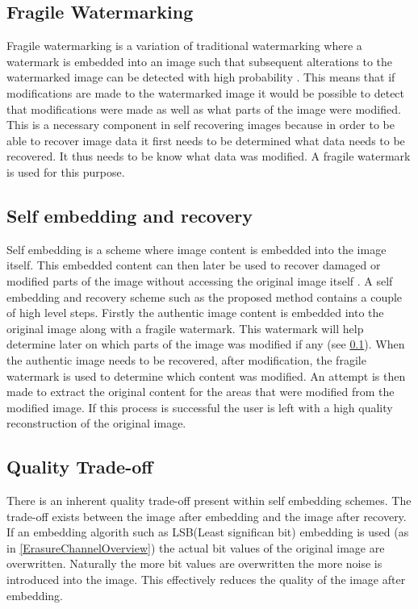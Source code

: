 \documentclass[12pt]{article}
\begin{document}
\subsection{Fragile Watermarking}
\label{introFragWatermarking}
Fragile watermarking is a variation of traditional watermarking where a watermark is embedded into an image such that subsequent alterations to the watermarked image can be detected with high probability \cite{lin1999review}.
This means that if modifications are made to the watermarked image it would be possible to detect that modifications were made as well as what parts of the image were modified.
This is a necessary component in self recovering images because in order to be able to recover image data it first needs to be determined what data needs to be recovered.
It thus needs to be know what data was modified.
A fragile watermark is used for this purpose. 

\subsection{Self embedding and recovery}
\label{introSelfEmbedRecovery}
Self embedding is a scheme where image content is embedded into the image itself. This embedded content can then later be used to recover damaged or modified parts of the image without accessing the original image itself \cite{fridrich1999images}.
A self embedding and recovery scheme such as the proposed method contains a couple of high level steps.
Firstly the authentic image content is embedded into the original image along with a fragile watermark.
This watermark will help determine later on which parts of the image was modified if any (see \ref{introFragWatermarking}).
When the authentic image needs to be recovered, after modification, the fragile watermark is used to determine which content was modified.
An attempt is then made to extract the original content for the areas that were modified from the modified image.
If this process is successful the user is left with a high quality reconstruction of the original image.

\subsection{Quality Trade-off}
\label{introQualityTrade}
There is an inherent quality trade-off present within self embedding schemes.
The trade-off exists between the image after embedding and the image after recovery.
If an embedding algorith such as LSB(Least significan bit) embedding is used (as in \ref{ErasureChannelOverview}) the actual bit values of the original image are overwritten.
Naturally the more bit values are overwritten the more noise is introduced into the image.
This effectively reduces the quality of the image after embedding.
\end{document}
